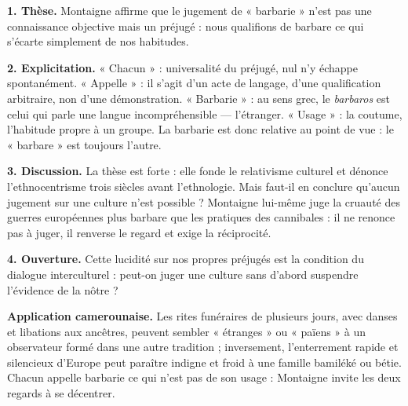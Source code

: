 \documentclass[11pt]{article}
\begin{document}
\begin{corrige}
\textbf{1. Thèse.} Montaigne affirme que le jugement de « barbarie » n'est pas une connaissance objective mais un préjugé : nous qualifions de barbare ce qui s'écarte simplement de nos habitudes.

\textbf{2. Explicitation.} « Chacun » : universalité du préjugé, nul n'y échappe spontanément. « Appelle » : il s'agit d'un acte de langage, d'une qualification arbitraire, non d'une démonstration. « Barbarie » : au sens grec, le \emph{barbaros} est celui qui parle une langue incompréhensible — l'étranger. « Usage » : la coutume, l'habitude propre à un groupe. La barbarie est donc relative au point de vue : le « barbare » est toujours l'autre.

\textbf{3. Discussion.} La thèse est forte : elle fonde le relativisme culturel et dénonce l'ethnocentrisme trois siècles avant l'ethnologie. Mais faut-il en conclure qu'aucun jugement sur une culture n'est possible ? Montaigne lui-même juge la cruauté des guerres européennes plus barbare que les pratiques des cannibales : il ne renonce pas à juger, il renverse le regard et exige la réciprocité.

\textbf{4. Ouverture.} Cette lucidité sur nos propres préjugés est la condition du dialogue interculturel : peut-on juger une culture sans d'abord suspendre l'évidence de la nôtre ?

\textbf{Application camerounaise.} Les rites funéraires de plusieurs jours, avec danses et libations aux ancêtres, peuvent sembler « étranges » ou « païens » à un observateur formé dans une autre tradition ; inversement, l'enterrement rapide et silencieux d'Europe peut paraître indigne et froid à une famille bamiléké ou bétie. Chacun appelle barbarie ce qui n'est pas de son usage : Montaigne invite les deux regards à se décentrer.
\end{corrige}
\end{document}
